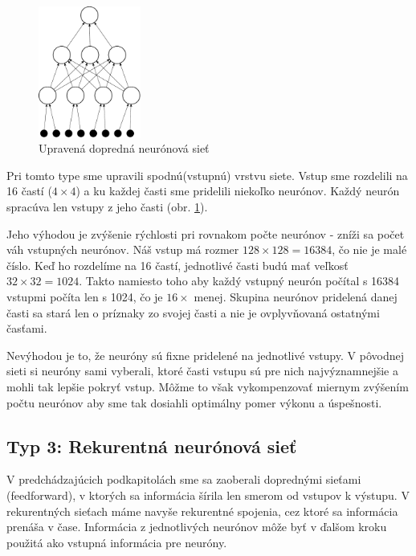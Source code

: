 \begin{figure}[h]
  \begin{center}
    \includegraphics[width=0.3\textwidth]{images/dffnn}
  \end{center}
  \caption{Upravená dopredná neurónová sieť}
  \label{fig:dffnn}
\end{figure}

Pri tomto type sme upravili spodnú(vstupnú) vrstvu siete. Vstup sme rozdelili na 16 častí ($4\times 4$) a ku každej časti sme pridelili niekoľko neurónov.
Každý neurón spracúva len vstupy z jeho časti (obr. \ref{fig:dffnn}). 

Jeho výhodou je zvýšenie rýchlosti pri rovnakom počte neurónov - zníži sa počet váh vstupných neurónov. Náš vstup má rozmer $128\times 128 = 16384$, čo nie je malé číslo. Keď ho rozdelíme na 16 častí, jednotlivé časti budú mať veľkosť $32\times 32 = 1024$. Takto namiesto toho aby každý vstupný neurón počítal s 16384 vstupmi počíta len s 1024, čo je $16\times$ menej. Skupina neurónov pridelená danej časti sa stará len o príznaky zo svojej časti a nie je ovplyvňovaná ostatnými časťami. 

Nevýhodou je to, že neuróny sú fixne pridelené na jednotlivé vstupy. V pôvodnej sieti si neuróny sami vyberali, ktoré časti vstupu sú pre nich najvýznamnejšie a mohli tak lepšie pokryť vstup. Môžme to však vykompenzovať miernym zvýšením počtu neurónov aby sme tak dosiahli optimálny pomer výkonu a úspešnosti.

\subsection{Typ 3: Rekurentná neurónová sieť}

V predchádzajúcich podkapitolách sme sa zaoberali doprednými sieťami (feedforward), v ktorých sa informácia šírila len smerom od vstupov k výstupu. V rekurentných sieťach máme navyše rekurentné spojenia, cez ktoré sa informácia prenáša v čase. Informácia z jednotlivých neurónov môže byť v ďalšom kroku použitá ako vstupná informácia pre neuróny.


